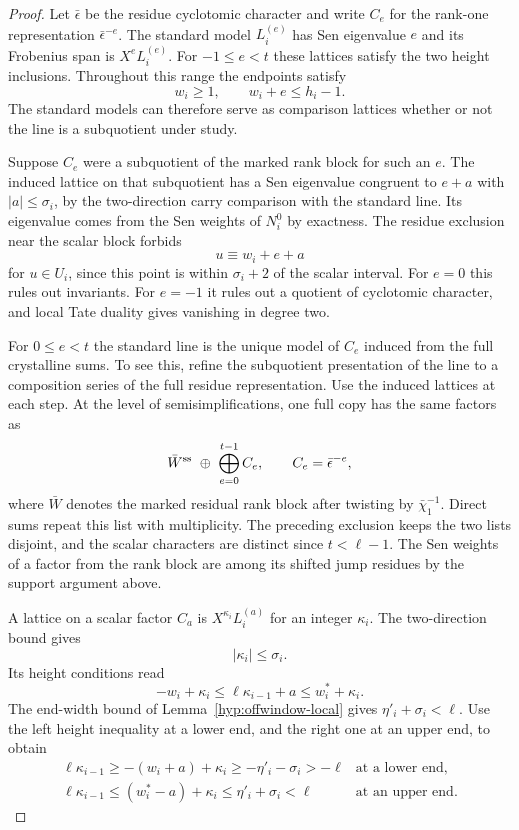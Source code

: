 \begin{proof}
Let \(\bar\epsilon\) be the residue cyclotomic character and
write \(C_e\) for the rank-one representation
\(\bar\epsilon^{-e}\). The standard model \(L_i^{(e)}\) has
Sen eigenvalue \(e\) and its Frobenius span is \(X^eL_i^{(e)}\).
For \(-1\le e<t\) these lattices satisfy the two height
inclusions. Throughout this range the endpoints satisfy
\[
 w_i\ge1,\qquad w_i+e\le h_i-1.
\]
The standard models can therefore
serve as comparison lattices whether or not the line
is a subquotient under study.

Suppose \(C_e\) were a subquotient of the marked rank block
for such an \(e\). The induced lattice on that subquotient
has a Sen eigenvalue congruent to \(e+a\) with
\(|a|\le\sigma_i\), by the two-direction carry comparison
with the standard line. Its eigenvalue comes from the
Sen weights of \(N_i^0\) by exactness.
The residue exclusion near the scalar block forbids
\[
 u\equiv w_i+e+a
\]
for \(u\in U_i\), since this point
is within \(\sigma_i+2\) of the scalar interval.
For \(e=0\) this rules out invariants. For \(e=-1\)
it rules out a quotient of cyclotomic character,
and local Tate duality gives vanishing in degree two.
\label{cor:residue-model-length-6}

For \(0\le e<t\) the standard line is the unique
model of \(C_e\) induced from the full crystalline sums.
To see this, refine the subquotient presentation of
the line to a composition series of the full residue
representation. Use the induced lattices at each step.
At the level of semisimplifications, one full copy has the same factors as
\[
 \bar W^{\rm ss}\ \oplus\ \bigoplus_{e=0}^{t-1} C_e,\qquad C_e=\bar\epsilon^{-e},
\]
where \(\bar W\) denotes the marked residual rank block after twisting by \(\bar\chi_1^{-1}\). Direct sums repeat this list with multiplicity.
The preceding exclusion keeps the two lists disjoint, and
the scalar characters are distinct since \(t<\ell-1\).
The Sen weights of a factor from the rank block are among
its shifted jump residues by the support argument above.

A lattice on a scalar factor \(C_a\) is \(X^{\kappa_i}L_i^{(a)}\)
for an integer \(\kappa_i\). The two-direction bound gives
\[
 |\kappa_i|\le\sigma_i.
\]
Its height conditions read
\[
 -w_i+\kappa_i\le \ell\kappa_{i-1}+a
                      \le w_i^*+\kappa_i .
\]
The end-width bound of Lemma~\ref{hyp:offwindow-local}
gives \(\eta'_i+\sigma_i<\ell\). Use the left height inequality
at a lower end, and the right one at an upper end, to obtain
\begin{equation}\label{eq:scalar-end-signs}
 \begin{array}{ll}
 \ell\kappa_{i-1}\ge -(w_i+a)+\kappa_i
          \ge-\eta'_i-\sigma_i>-\ell
     &\text{at a lower end},\\
 \ell\kappa_{i-1}\le (w_i^*-a)+\kappa_i
          \le\eta'_i+\sigma_i<\ell
     &\text{at an upper end}.
 \end{array}
\end{equation}


\end{proof}
